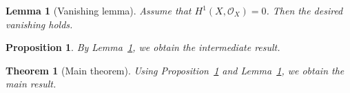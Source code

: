 \documentclass{article}
\newtheorem{theorem}{Theorem}
\newtheorem{lemma}{Lemma}
\newtheorem{proposition}{Proposition}
\begin{document}
\begin{lemma}[Vanishing lemma]
Assume that $H^1(X,\mathcal O_X)=0$.
Then the desired vanishing holds.
\label{lem:vanishing}
\end{lemma}

\begin{proposition}
By Lemma~\ref{lem:vanishing}, we obtain the intermediate result.
\label{prop:key}
\end{proposition}

\begin{theorem}[Main theorem]
Using Proposition~\ref{prop:key}
and Lemma~\ref{lem:vanishing},
we obtain the main result.
\label{thm:main}
\end{theorem}
\end{document}
